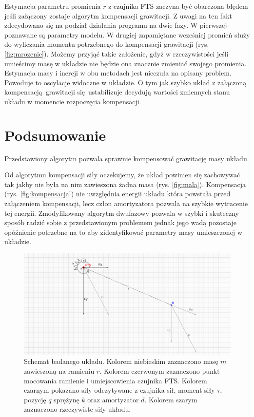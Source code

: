 \documentclass[a4paper, 10pt]{article}
\begin{document}
Estymacja parametru promienia $r$ z czujnika FTS zaczyna być obarczona błędem jeśli załączony zostaje algorytm kompensacji grawitacji. Z uwagi na ten fakt zdecydowano się na podział działania programu na dwie fazy. W pierwszej poznawane są parametry modelu. W drugiej zapamiętane wcześniej promień służy do wyliczania momentu potrzebnego do kompensacji grawitacji (rys. \ref{fig:mrozenie}). Możemy przyjąć takie założenie, gdyż w rzeczywistości jeśli umieścimy masę w układzie nie będzie ona znacznie zmieniać swojego promienia. Estymacja masy i inercji w obu metodach jest nieczuła na opisany problem. Powoduje to oscylacje widoczne w układzie. O tym jak szybko układ z załączoną kompensacją grawitacji się ustabilizuje decydują wartości zmiennych stanu układu w momencie rozpoczęcia kompensacji.\\



\section{Podsumowanie}

Przedstawiony algorytm pozwala sprawnie kompensować grawitację masy układu.

Od algorytmu kompensacji siły oczekujemy, że układ powinien się zachowywać tak jakby nie była na nim zawieszona żadna masa (rys. \ref{fig:mala}). Kompensacja (rys. \ref{fig:kompensacja}) nie uwzględnia energii układu która powstała przed załączeniem kompensacji, lecz człon amortyzatora pozwala na szybkie wytracenie tej energii. Zmodyfikowany algorytm dwufazowy pozwala w szybki i skuteczny sposób radzić sobie z przedstawionym problemem jednak jego wadą pozostaje opóźnienie potrzebne na to aby zidentyfikować parametry masy umieszczonej w układzie. 





\begin{figure}[H]
	\includegraphics[width=0.99\linewidth]{2d}
	\centering
	\caption{Schemat badanego układu. Kolorem niebieskim zaznaczono masę $m$ zawieszoną na ramieniu $r$. Kolorem czerwonym zaznaczono punkt mocowania ramienie i umiejscowienia czujnika FTS. Kolorem czarnym pokazano siły odczytywane z czujnika sił, moment siły $\tau$, pozycję $q$ sprężynę $k$ oraz amortyzator $d$. Kolorem szarym zaznaczono rzeczywiste siły układu.}
	\label{fig:2d}
\end{figure}
\end{document}
